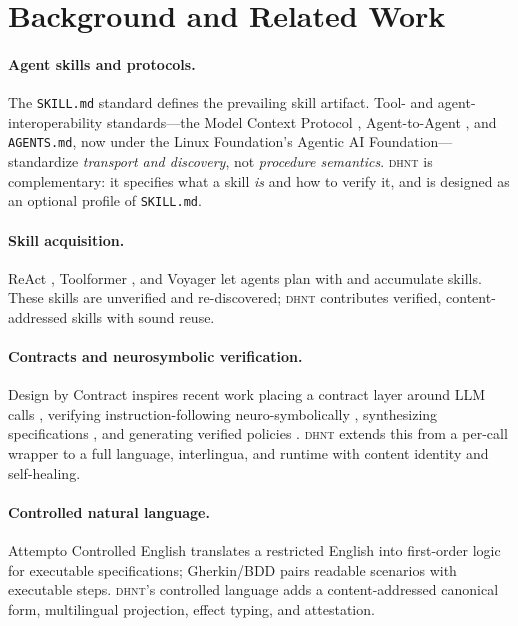 \documentclass[11pt]{article}
\newcommand{\dhnt}{\textsc{dhnt}}
\begin{document}
\section{Background and Related Work}\label{sec:related}

\paragraph{Agent skills and protocols.} The \texttt{SKILL.md} standard
\cite{agentskills} defines the prevailing skill artifact. Tool- and
agent-interoperability standards---the Model Context Protocol \cite{mcp},
Agent-to-Agent \cite{a2a}, and \texttt{AGENTS.md}, now under the Linux
Foundation's Agentic AI Foundation---standardize \emph{transport and discovery},
not \emph{procedure semantics}. \dhnt{} is complementary: it specifies what a
skill \emph{is} and how to verify it, and is designed as an optional profile of
\texttt{SKILL.md}.

\paragraph{Skill acquisition.} ReAct \cite{react}, Toolformer \cite{toolformer},
and Voyager \cite{voyager} let agents plan with and accumulate skills. These
skills are unverified and re-discovered; \dhnt{} contributes verified,
content-addressed skills with sound reuse.

\paragraph{Contracts and neurosymbolic verification.} Design by Contract
\cite{meyer} inspires recent work placing a contract layer around LLM calls
\cite{dbcagent}, verifying instruction-following neuro-symbolically
\cite{nsverify}, synthesizing specifications \cite{specsynth}, and generating
verified policies \cite{verafi}. \dhnt{} extends this from a per-call wrapper to
a full language, interlingua, and runtime with content identity and self-healing.

\paragraph{Controlled natural language.} Attempto Controlled English
\cite{ace} translates a restricted English into first-order logic for executable
specifications; Gherkin/BDD pairs readable scenarios with executable steps.
\dhnt{}'s controlled language adds a content-addressed canonical form,
multilingual projection, effect typing, and attestation.
\end{document}
